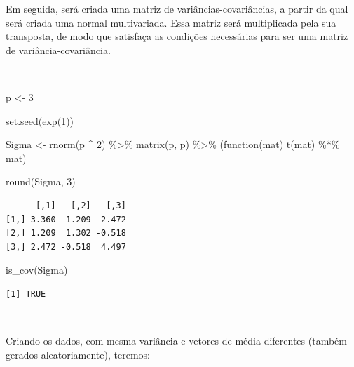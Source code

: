 \documentclass[
  a4paperpaper,
]{article}
\newenvironment{Shaded}{\begin{snugshade}}{\end{snugshade}}
\newcommand{\ControlFlowTok}[1]{\textcolor[rgb]{0.00,0.23,0.31}{#1}}
\newcommand{\DecValTok}[1]{\textcolor[rgb]{0.68,0.00,0.00}{#1}}
\newcommand{\FunctionTok}[1]{\textcolor[rgb]{0.28,0.35,0.67}{#1}}
\newcommand{\NormalTok}[1]{\textcolor[rgb]{0.00,0.23,0.31}{#1}}
\newcommand{\OtherTok}[1]{\textcolor[rgb]{0.00,0.23,0.31}{#1}}
\newcommand{\SpecialCharTok}[1]{\textcolor[rgb]{0.37,0.37,0.37}{#1}}
\begin{document}
Em seguida, será criada uma matriz de variâncias-covariâncias, a partir
da qual será criada uma normal multivariada. Essa matriz será
multiplicada pela sua transposta, de modo que satisfaça as condições
necessárias para ser uma matriz de variância-covariância.

~

\begin{Shaded}
\begin{Highlighting}[]
\NormalTok{p }\OtherTok{\textless{}{-}} \DecValTok{3}

\FunctionTok{set.seed}\NormalTok{(}\FunctionTok{exp}\NormalTok{(}\DecValTok{1}\NormalTok{))}

\NormalTok{Sigma }\OtherTok{\textless{}{-}} \FunctionTok{rnorm}\NormalTok{(p }\SpecialCharTok{\^{}} \DecValTok{2}\NormalTok{) }\SpecialCharTok{\%\textgreater{}\%}
    \FunctionTok{matrix}\NormalTok{(p, p) }\SpecialCharTok{\%\textgreater{}\%}
\NormalTok{    (}\ControlFlowTok{function}\NormalTok{(mat) }\FunctionTok{t}\NormalTok{(mat) }\SpecialCharTok{\%*\%}\NormalTok{ mat)}

\FunctionTok{round}\NormalTok{(Sigma, }\DecValTok{3}\NormalTok{)}
\end{Highlighting}
\end{Shaded}

\begin{verbatim}
      [,1]   [,2]   [,3]
[1,] 3.360  1.209  2.472
[2,] 1.209  1.302 -0.518
[3,] 2.472 -0.518  4.497
\end{verbatim}

\begin{Shaded}
\begin{Highlighting}[]
\FunctionTok{is\_cov}\NormalTok{(Sigma)}
\end{Highlighting}
\end{Shaded}

\begin{verbatim}
[1] TRUE
\end{verbatim}

~

Criando os dados, com mesma variância e vetores de média diferentes
(também gerados aleatoriamente), teremos:

~
\end{document}
